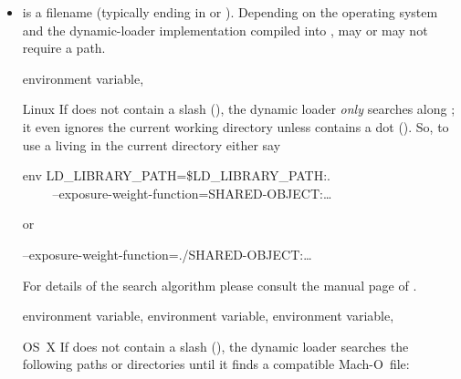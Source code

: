 \begin{itemize}
\item
   is a filename (typically ending in  or ).
  Depending on the operating system and the dynamic-loader implementation compiled into \appcmd,
   may or may not require a path.

         {environment variable, }%
  \begin{restrictedmaterial}{Linux}
    If  does not contain a slash (\sample{/}), the dynamic loader
    \emph{only} searches along ; it even ignores the current working
    directory unless  contains a dot ().  So, to use a
     living in the current directory either say
    \begin{literal}
      env LD\_LIBRARY\_PATH=\$LD\_LIBRARY\_PATH:. \bslash \\
      ~~~~\app{} --exposure-weight-function=\feasiblebreak SHARED-OBJECT:\dots
    \end{literal}
    or
    \begin{literal}
      \app{} --exposure-weight-function=\feasiblebreak ./SHARED-OBJECT:\dots
    \end{literal}

    For details of the search algorithm please consult the manual page of .
  \end{restrictedmaterial}

  \smallskip

         {environment variable, }%
         {environment variable, }%
         {environment variable, }%
  \begin{restrictedmaterial}{OS~X}
    If  does not contain a slash (\sample{/}), the dynamic loader
    searches the following paths or directories until it finds a compatible Mach-O~file:


\end{restrictedmaterial}
\end{itemize}
